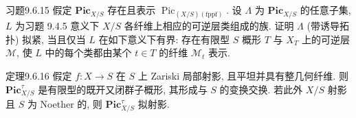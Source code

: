 \begin{origstatement}{习题}{9.6.15}\label{ch09s6:ex9615}
假定 $\mathbf{Pic}_{X/S}$ 存在且表示 $\operatorname{Pic}_{(X/S)(\mathrm{fppf})}$. 设 $\Lambda$ 为 $\mathbf{Pic}_{X/S}$ 的任意子集, $L$ 为习题 9.4.5 意义下 $X/S$ 各纤维上相应的可逆层类组成的族. 证明 $\Lambda$ (带诱导拓扑) 拟紧, 当且仅当 $L$ 在如下意义下有界: 存在有限型 $S$ 概形 $T$ 与 $X_T$ 上的可逆层 $\mathcal M$, 使 $L$ 中的每个类都由某个 $t\in T$ 的纤维 $\mathcal M_t$ 表示.
\end{origstatement}

\begin{origstatement}{定理}{9.6.16}\label{ch09s6:th9616}
假定 $f:X\to S$ 在 $S$ 上 Zariski 局部射影, 且平坦并具有整几何纤维. 则 $\mathbf{Pic}_{X/S}^{\tau}$ 是有限型的既开又闭群子概形, 其形成与 $S$ 的变换交换. 若此外 $X/S$ 射影且 $S$ 为 Noether 的, 则 $\mathbf{Pic}_{X/S}^{\tau}$ 拟射影.
\end{origstatement}
